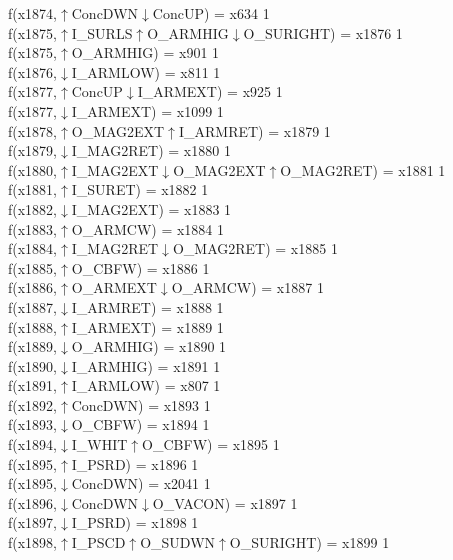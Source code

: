 f(x1874,$\uparrow$ConcDWN$\downarrow$ConcUP) = x634 {1} \\
f(x1875,$\uparrow$I\_SURLS$\uparrow$O\_ARMHIG$\downarrow$O\_SURIGHT) = x1876 {1} \\
f(x1875,$\uparrow$O\_ARMHIG) = x901 {1} \\
f(x1876,$\downarrow$I\_ARMLOW) = x811 {1} \\
f(x1877,$\uparrow$ConcUP$\downarrow$I\_ARMEXT) = x925 {1} \\
f(x1877,$\downarrow$I\_ARMEXT) = x1099 {1} \\
f(x1878,$\uparrow$O\_MAG2EXT$\uparrow$I\_ARMRET) = x1879 {1} \\
f(x1879,$\downarrow$I\_MAG2RET) = x1880 {1} \\
f(x1880,$\uparrow$I\_MAG2EXT$\downarrow$O\_MAG2EXT$\uparrow$O\_MAG2RET) = x1881 {1} \\
f(x1881,$\uparrow$I\_SURET) = x1882 {1} \\
f(x1882,$\downarrow$I\_MAG2EXT) = x1883 {1} \\
f(x1883,$\uparrow$O\_ARMCW) = x1884 {1} \\
f(x1884,$\uparrow$I\_MAG2RET$\downarrow$O\_MAG2RET) = x1885 {1} \\
f(x1885,$\uparrow$O\_CBFW) = x1886 {1} \\
f(x1886,$\uparrow$O\_ARMEXT$\downarrow$O\_ARMCW) = x1887 {1} \\
f(x1887,$\downarrow$I\_ARMRET) = x1888 {1} \\
f(x1888,$\uparrow$I\_ARMEXT) = x1889 {1} \\
f(x1889,$\downarrow$O\_ARMHIG) = x1890 {1} \\
f(x1890,$\downarrow$I\_ARMHIG) = x1891 {1} \\
f(x1891,$\uparrow$I\_ARMLOW) = x807 {1} \\
f(x1892,$\uparrow$ConcDWN) = x1893 {1} \\
f(x1893,$\downarrow$O\_CBFW) = x1894 {1} \\
f(x1894,$\downarrow$I\_WHIT$\uparrow$O\_CBFW) = x1895 {1} \\
f(x1895,$\uparrow$I\_PSRD) = x1896 {1} \\
f(x1895,$\downarrow$ConcDWN) = x2041 {1} \\
f(x1896,$\downarrow$ConcDWN$\downarrow$O\_VACON) = x1897 {1} \\
f(x1897,$\downarrow$I\_PSRD) = x1898 {1} \\
f(x1898,$\uparrow$I\_PSCD$\uparrow$O\_SUDWN$\uparrow$O\_SURIGHT) = x1899 {1} \\
